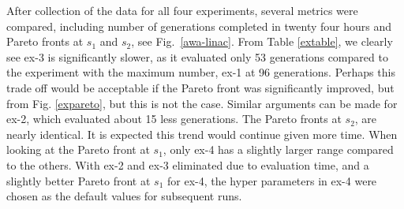 After collection of the data for all four experiments, several metrics
were compared, including number of generations completed in twenty four hours and
Pareto fronts at $s_1$ and $s_2$, see Fig.~\ref{awa-linac}.
From Table \ref{extable}, we clearly see ex-3 is significantly 
slower, as it evaluated only 53 generations 
compared to the experiment with the maximum number, ex-1 at 96 generations.
Perhaps this trade off would be acceptable if the Pareto front was significantly 
improved, but from Fig. \ref{expareto}, but this is not the case.
Similar arguments can be made for ex-2, which evaluated about 15 less generations.
The Pareto fronts at $s_2$, are nearly identical. It is expected
this trend would continue given more time. 
When looking at the Pareto front at $s_1$, only ex-4 has a slightly 
larger range compared to the others.
With ex-2 and ex-3 eliminated due to evaluation time, 
and a slightly better Pareto front at $s_1$ for ex-4, 
the hyper parameters in ex-4 were chosen as the default values for subsequent runs.


